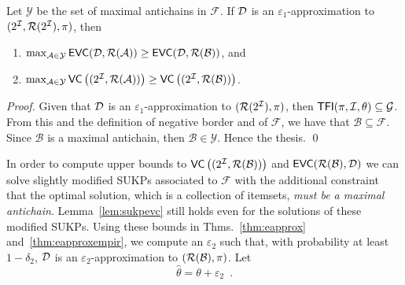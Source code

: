 \begin{lemma}\label{lem:antichains}
  Let $\mathcal{Y}$ be the set of maximal antichains in $\mathcal{F}$. If
  ${\cal D}$ is an $\varepsilon_1$-approximation to $(2^{\cal I},\mathcal{R}(2^{\cal I}),\pi)$, then
  \begin{enumerate}
    \item
      $\max_{\mathcal{A}\in\mathcal{Y}}\mathsf{EVC}({\cal D},\mathcal{R}(\mathcal{A}))\ge\mathsf{EVC}({\cal D},\mathcal{R}(\mathcal{B}))$,
      and
    \item
      $\max_{\mathcal{A}\in\mathcal{Y}}\mathsf{VC}\left((2^{\cal I},\mathcal{R}(\mathcal{A}))\right)\ge\mathsf{VC}\left((2^{\cal I},\mathcal{R}(\mathcal{B}))\right)$.
  \end{enumerate}
\end{lemma}
\ifarxiv
\begin{proof}
  Given %
  that ${\cal D}$ is an $\varepsilon_1$-approximation to $(\mathcal{R}(2^{\cal I}),\pi)$, %
  then %
  $\mathsf{TFI}(\pi,{\cal I},\theta)\subseteq\mathcal{G}$. %
  From this and
  the definition of negative border and of $\mathcal{F}$, we have that
  $\mathcal{B}\subseteq\mathcal{F}$. Since $\mathcal{B}$ is a maximal
  antichain, then $\mathcal{B}\in\mathcal{Y}$. Hence the thesis.
  \qed
\end{proof}
\fi

In order to compute upper bounds to
$\mathsf{VC}\left((2^{\cal I},\mathcal{R}(\mathcal{B}))\right)$ and
$\mathsf{EVC}(\mathcal{R}(\mathcal{B}),{\cal D})$ we can solve slightly modified SUKPs 
associated to $\mathcal{F}$ with the additional constraint that the
optimal solution, which is a collection of itemsets, \emph{must be a maximal
antichain}. Lemma~\ref{lem:sukpevc} still holds even for the solutions of these
modified SUKPs. Using these bounds in Thms.~\ref{thm:eapprox}
and~\ref{thm:eapproxempir}, we compute an $\varepsilon_2$ such that, with
probability at least $1-\delta_2$, ${\cal D}$ is an $\varepsilon_2$-approximation to
$(\mathcal{R}(\mathcal{B}),\pi)$. Let 
\[
\hat{\theta}=\theta+\varepsilon_2\enspace.\]



